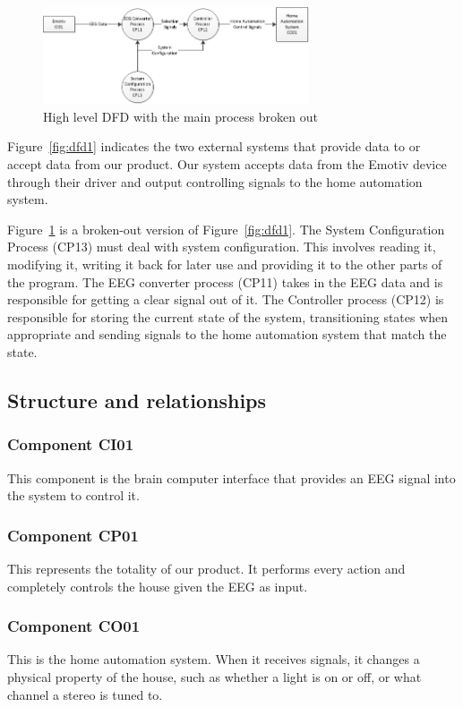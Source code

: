 \documentclass{article}
\begin{document}
\begin{figure}[h!]
	
  \centering
    \includegraphics[width=0.7\textwidth]{DFD2}
   \caption{High level DFD with the main process broken out}
   \label{fig:dfd2}
\end{figure}

Figure~\ref{fig:dfd1} indicates the two external systems that
provide data to or accept data from our product. Our
system accepts data from the Emotiv device through their driver and output
controlling signals to the home automation system.

Figure~\ref{fig:dfd2} is a broken-out version of Figure~\ref{fig:dfd1}. The System
Configuration Process (CP13) must deal with system configuration. This
involves reading it, modifying it,
writing it back for later use and providing it to the other parts of the
program. The EEG converter process (CP11) takes in the EEG data and is
responsible for getting a clear signal out of it. The Controller process (CP12) is responsible for storing the current state of the system, transitioning
states when appropriate and sending signals to the home automation system that
match the state.

\subsection{Structure and relationships}

\subsubsection{Component CI01}
This component is the brain computer interface that provides an EEG signal into the system to control it.

\subsubsection{Component CP01}
This represents the totality of our product. It performs every action and completely controls the house given the EEG as input.

\subsubsection{Component CO01}
This is the home automation system. When it receives signals, it changes a physical property of the house, such as whether a light is on or off, or what channel a stereo is tuned to.
\end{document}
